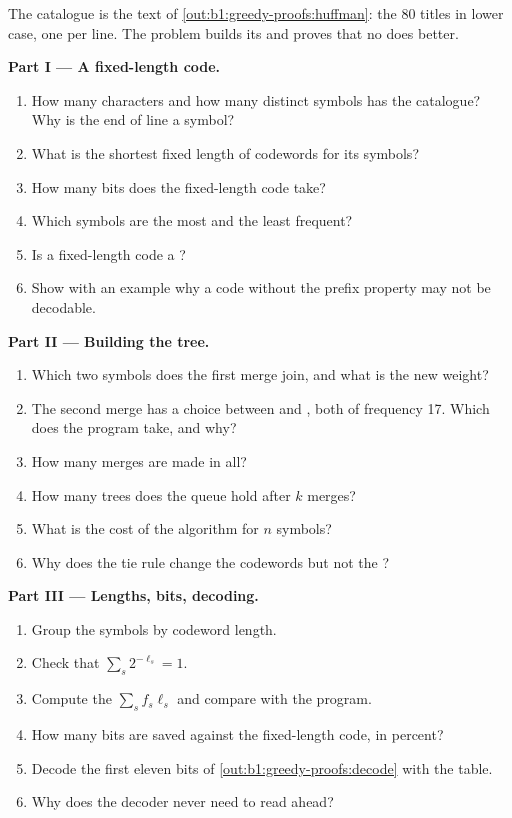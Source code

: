 \begin{problem}\label{pb:b1:greedy-proofs:1}
The catalogue is the text of \cref{out:b1:greedy-proofs:huffman}: the 80 titles in lower case, one per line. The problem
builds its  and proves that no  does better.

\medskip\noindent\textbf{Part I --- A fixed-length code.}
\begin{enumerate}
\item How many characters and how many distinct symbols has the catalogue? Why is the end of line a symbol?
\item What is the shortest fixed length of codewords for its symbols?
\item How many bits does the fixed-length code take?
\item Which symbols are the most and the least frequent?
\item Is a fixed-length code a ?
\item Show with an example why a code without the prefix property may not be decodable.
\end{enumerate}

\medskip\noindent\textbf{Part II --- Building the tree.}
\begin{enumerate}[resume]
\item Which two symbols does the first merge join, and what is the new weight?
\item The second merge has a choice between  and , both of frequency 17. Which does the program take,
and why?
\item How many merges are made in all?
\item How many trees does the queue hold after $k$ merges?
\item What is the cost of the algorithm for $n$ symbols?
\item Why does the tie rule change the codewords but not the ?
\end{enumerate}

\medskip\noindent\textbf{Part III --- Lengths, bits, decoding.}
\begin{enumerate}[resume]
\item Group the symbols by codeword length.
\item Check that $\sum_s 2^{-\ell_s} = 1$.
\item Compute the  $\sum_s f_s \ell_s$ and compare with the program.
\item How many bits are saved against the fixed-length code, in percent?
\item Decode the first eleven bits of \cref{out:b1:greedy-proofs:decode} with the table.
\item Why does the decoder never need to read ahead?
\end{enumerate}


\end{problem}
